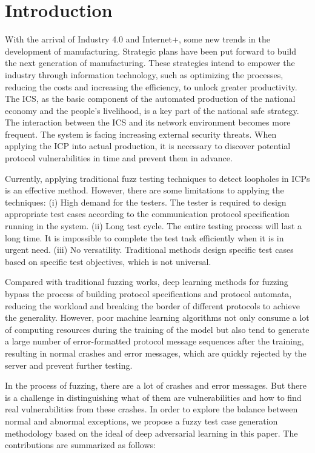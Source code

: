 \section{Introduction}

With the arrival of Industry 4.0 and Internet+, some new trends in the development of manufacturing. Strategic plans have been put forward to build the next generation of manufacturing. These strategies intend to empower the industry through information technology, such as optimizing the processes, reducing the costs and increasing the efficiency, to unlock greater productivity. The ICS, as the basic component of the automated production of the national economy and the people's livelihood, is a key part of the national safe strategy. The interaction between the ICS and its network environment becomes more frequent. The system is facing increasing external security threats. When applying the ICP into actual production, it is necessary to discover potential protocol vulnerabilities in time and prevent them in advance. 

Currently, applying traditional fuzz testing techniques to detect loopholes in ICPs is an effective method. However, there are some limitations to applying the techniques: (i) High demand for the testers. The tester is required to design appropriate test cases according to the communication protocol specification running in the system. (ii) Long test cycle. The entire testing process will last a long time. It is impossible to complete the test task efficiently when it is in urgent need. (iii) No versatility. Traditional methods design specific test cases based on specific test objectives, which is not universal.

Compared with traditional fuzzing works, deep learning methods for fuzzing bypass the process of building protocol specifications and protocol automata, reducing the workload and breaking the border of different protocols to achieve the generality. However, poor machine learning algorithms not only consume a lot of computing resources during the training of the model but also tend to generate a large number of error-formatted protocol message sequences after the training, resulting in normal crashes and error messages, which are quickly rejected by the server and prevent further testing.

In the process of fuzzing, there are a lot of crashes and error messages. But there is a challenge in distinguishing what of them are vulnerabilities and how to find real vulnerabilities from these crashes. In order to explore the balance between normal and abnormal exceptions, we propose a fuzzy test case generation methodology based on the ideal of deep adversarial learning in this paper. The contributions are summarized as follows:

